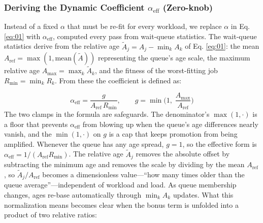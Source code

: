 \documentclass{ieeetj}
\begin{document}
\begin{table}[htb!]
\centering
\caption{Optimal $\alpha$ by distribution}
\label{fig:motivation}
\footnotesize
\setlength{\tabcolsep}{4pt}
\end{table}

\subsubsection{Deriving the Dynamic Coefficient $\alpha_{\text{eff}}$ (Zero-knob)}\label{SAFA}
Instead of a fixed $\alpha$ that must be re-fit for every workload, we replace $\alpha$ in Eq. \eqref{eq:01} with $\alpha_{\text{eff}}$, computed every pass from wait-queue statistics. The wait-queue statistics derive from the relative age $\tilde A_j = A_j - \min_k A_k$ of Eq. \eqref{eq:01}: the mean $A_{\text{ref}} = \max(1,\text{mean}(\tilde A))$ representing the queue's age scale, the maximum relative age $A_{\max}=\max_k \tilde A_k$, and the fitness of the worst-fitting job $R_{\min}=\min_k R_k$. From these the coefficient is defined as:

\begin{equation}
\alpha_{\text{eff}} = \frac{g}{A_{\text{ref}}\,R_{\min}},\qquad g=\min\!\Big(1,\;\frac{A_{\max}}{A_{\text{ref}}}\Big)
\label{eq:auto-alpha}
\end{equation}
The two clamps in the formula are safeguards. The denominator's $\max(1,\cdot)$ is a floor that prevents $\alpha_{\text{eff}}$ from blowing up when the queue's age differences nearly vanish, and the $\min(1,\cdot)$ on $g$ is a cap that keeps promotion from being amplified. Whenever the queue has any age spread, $g=1$, so the effective form is $\alpha_{\text{eff}}=1/(A_{\text{ref}}R_{\min})$. The relative age $\tilde A_j$ removes the absolute offset by subtracting the minimum age and removes the scale by dividing by the mean $A_{\text{ref}}$, so $\tilde A_j/A_{\text{ref}}$ becomes a dimensionless value---``how many times older than the queue average''---independent of workload and load. As queue membership changes, ages re-base automatically through $\min_k A_k$ updates. What this normalization means becomes clear when the bonus term is unfolded into a product of two relative ratios:
\end{document}
